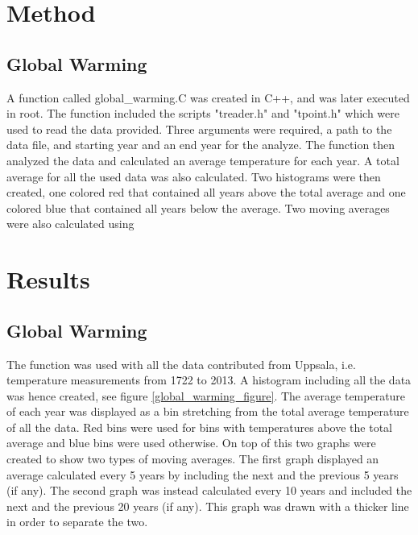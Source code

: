 \section{Method}

\subsection{Global Warming}

A function called global\_warming.C was created in C++, and was later executed in root. The function included the scripts "treader.h" and "tpoint.h" which were used to read the data provided. Three arguments were required, a path to the data file, and starting year and an end year for the analyze. The function then analyzed the data and calculated an average temperature for each year. A total average for all the used data was also calculated. Two histograms were then created, one colored red that contained all years above the total average and one colored blue that contained all years below the average. Two moving averages were also calculated using 

\section{Results}

\subsection{Global Warming}

The function was used with all the data contributed from Uppsala, i.e. temperature measurements from 1722 to 2013. A histogram including all the data was hence created,  see figure \ref{global_warming_figure}. The average temperature of each year was displayed as a bin stretching from the total average temperature of all the data. Red bins were used for bins with temperatures above the total average and blue bins were used otherwise. On top of this two graphs were created to show two types of moving averages. The first graph displayed an average calculated every 5 years by including the next and the previous 5 years (if any). The second graph was instead calculated every 10 years and included the next and the previous 20 years (if any). This graph was drawn with a thicker line in order to separate the two.

